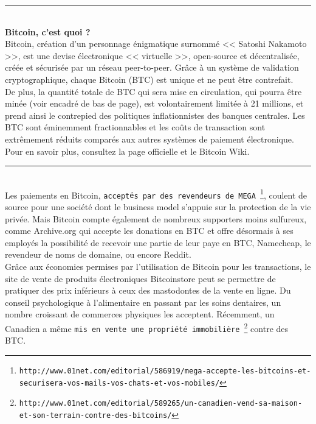 \documentclass[11pt,twoside,a4paper]{article}
\begin{document}
\hrule ~\\

{\footnotesize
	\textbf{Bitcoin, c'est quoi ?} ~\\
	
	Bitcoin, cr{\'e}ation d'un personnage {\'e}nigmatique surnomm{\'e} << Satoshi Nakamoto >>, est une devise {\'e}lectronique << virtuelle >>, open-source et d{\'e}centralis{\'e}e, cr{\'e}{\'e}e et s{\'e}curis{\'e}e par un r{\'e}seau peer-to-peer. Gr{\^a}ce {\`a} un syst{\`e}me de validation cryptographique, chaque Bitcoin (BTC) est unique et ne peut {\^e}tre contrefait. ~\\
	
	De plus, la quantit{\'e} totale de BTC qui sera mise en circulation, qui pourra {\^e}tre min{\'e}e (voir encadr{\'e} de bas de page), est volontairement limit{\'e}e {\`a} 21 millions, et prend ainsi le contrepied des politiques inflationnistes des banques centrales. Les BTC sont {\'e}minemment fractionnables et les co{\^u}ts de transaction sont extr{\^e}mement r{\'e}duits compar{\'e}s aux autres syst{\`e}mes de paiement {\'e}lectronique. ~\\
	
	Pour en savoir plus, consultez la page officielle et le Bitcoin Wiki. ~\\
}

\hrule ~\\

Les paiements en Bitcoin, \texttt{accept{\'e}s par des revendeurs de MEGA~\footnote{\texttt{http://www.01net.com/editorial/586919/mega-accepte-les-bitcoins-et-securisera-vos-mails-vos-chats-et-vos-mobiles/}}}, coulent de source pour une soci{\'e}t{\'e} dont le business model s'appuie sur la protection de la vie priv{\'e}e. Mais Bitcoin compte {\'e}galement de nombreux supporters moins sulfureux, comme Archive.org qui accepte les donations en BTC et offre d{\'e}sormais {\`a} ses employ{\'e}s la possibilit{\'e} de recevoir une partie de leur paye en BTC, Namecheap, le revendeur de noms de domaine, ou encore Reddit. ~\\

Gr{\^a}ce aux {\'e}conomies permises par l'utilisation de Bitcoin pour les transactions, le site de vente de produits {\'e}lectroniques Bitcoinstore peut se permettre de pratiquer des prix inf{\'e}rieurs {\`a} ceux des mastodontes de la vente en ligne. Du conseil psychologique {\`a} l'alimentaire en passant par les soins dentaires, un nombre croissant de commerces physiques les acceptent. R{\'e}cemment, un Canadien a m{\^e}me \texttt{mis en vente une propri{\'e}t{\'e} immobili{\`e}re~\footnote{\texttt{http://www.01net.com/editorial/589265/un-canadien-vend-sa-maison-et-son-terrain-contre-des-bitcoins/}}} contre des BTC. ~\\
\end{document}
